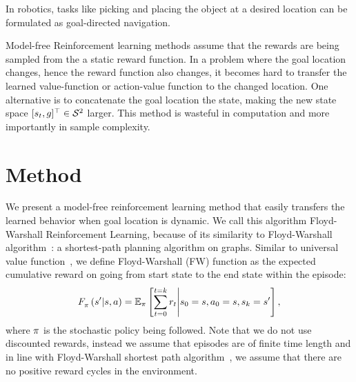 In robotics, tasks like picking and placing the object at a desired
location can be formulated as goal-directed navigation.

Model-free Reinforcement learning methods assume that the rewards are
being sampled from the a static reward function.  In a problem where the
goal location changes, hence the reward function also changes, it
becomes hard to transfer the learned value-function or action-value
function to the changed location.  One alternative is to concatenate the
goal location the state, making the new state space $[s_t,
g]^\top \in \mathcal{S}^2$ larger.  This method is wasteful in
computation and more importantly in sample complexity.

\section{Method}
We present a model-free reinforcement learning method that easily transfers the
learned behavior when goal location is dynamic. We call this algorithm
Floyd-Warshall Reinforcement Learning, because of its similarity to
Floyd-Warshall algorithm~\cite{floydwarshall1962}:
a shortest-path planning algorithm on graphs. Similar
to universal value function~\cite{schaul2015universal}, we define Floyd-Warshall
(FW) function as the expected cumulative reward on going from start state to the
end state within the episode:
%
\begin{align}
F_{\pi}^{}\left({s'}\middle|{s}, {a}\right) =
\mathbb{E}_{\pi}\left[ \sum_{t=0}^{t=k} r_t \middle\vert s_0 = s, a_0 = s, s_k = s' \right] ,
\end{align}%
%
where $\pi$ is the
stochastic policy being followed.
Note that we do not use discounted rewards, instead we assume that episodes are
of finite time length and in line with Floyd-Warshall shortest path
algorithm~\cite{floydwarshall1962}, we assume that there are no positive reward
cycles in the environment.

